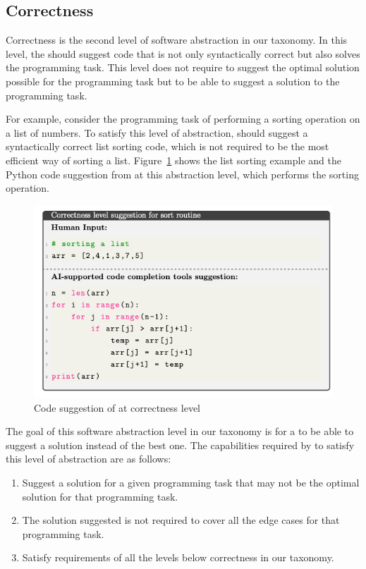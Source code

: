 \subsection{Correctness}
\label{correctness}
Correctness is the second level of software abstraction in our taxonomy. In this level, the \cct{} should suggest code that is not only syntactically correct but also solves the programming task. 
This level does not require \cct{} to suggest the optimal solution possible for the programming task but to be able to suggest a solution to the programming task.

For example, consider the programming task of performing a sorting operation on a list of numbers. To satisfy this level of abstraction, \cct{} should suggest a syntactically correct list sorting code, which is not required to be the most efficient way of sorting a list.
Figure~\ref{fig:correctness} shows the list sorting example and the Python code suggestion from \cct{} at this abstraction level, which performs the sorting operation.

\begin{figure}[hbt!]
    \centering
    \includegraphics[width=.9\linewidth]{Figures/correctness.png}
    \caption{Code suggestion of \cct{} at correctness level}
    \label{fig:correctness}
\end{figure}

The goal of this software abstraction level in our taxonomy is for a \cct{} to be able to suggest a solution instead of the best one.
The capabilities required by \cct{} to satisfy this level of abstraction are as follows:

\begin{enumerate}
    \item Suggest a solution for a given programming task that may not be the optimal solution for that programming task.
    \item The solution suggested is not required to cover all the edge cases for that programming task.
    \item Satisfy requirements of all the levels below correctness in our taxonomy.
\end{enumerate}

